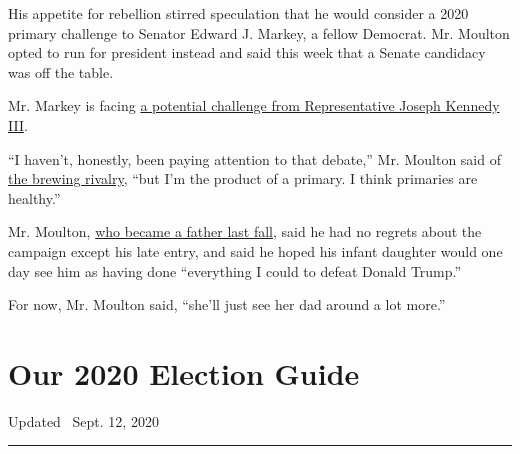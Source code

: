 His appetite for rebellion stirred speculation that he would consider a
2020 primary challenge to Senator Edward J. Markey, a fellow Democrat.
Mr. Moulton opted to run for president instead and said this week that a
Senate candidacy was off the table.

Mr. Markey is facing
\href{https://www.nytimes3xbfgragh.onion/2019/08/17/us/politics/joseph-kennedy-edward-markey-senate.html}{a
potential challenge from Representative Joseph Kennedy III}.

``I haven't, honestly, been paying attention to that debate,'' Mr.
Moulton said of
\href{https://www.nytimes3xbfgragh.onion/2019/08/23/us/politics/kennedy-markey-senate-2020.html}{the
brewing rivalry}, ``but I'm the product of a primary. I think primaries
are healthy.''

Mr. Moulton,
\href{https://www.nytimes3xbfgragh.onion/2019/06/16/us/politics/democratic-candidates-fathers-day.html}{who
became a father last fall}, said he had no regrets about the campaign
except his late entry, and said he hoped his infant daughter would one
day see him as having done ``everything I could to defeat Donald
Trump.''

For now, Mr. Moulton said, ``she'll just see her dad around a lot
more.''

\hypertarget{our-2020-election-guide}{%
\section{Our 2020 Election Guide}\label{our-2020-election-guide}}

Updated ~Sept. 12, 2020

\begin{center}\rule{0.5\linewidth}{\linethickness}\end{center}

